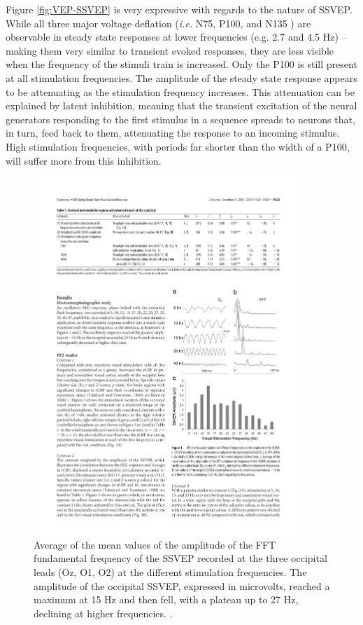 Figure \ref{fig:VEP-SSVEP} is very expressive with regards to the nature of SSVEP. 
While all three major voltage deflation (\textit{i.e.} N75, P100, and N135 ) are observable in steady state responses at lower frequencies (e.g. 2.7 and 4.5 Hz) -- making them very similar to transient evoked responses, they are less visible when the frequency of the stimuli train is increased. 
Only the P100 is still present at all stimulation frequencies. The amplitude of the steady state response appears to be attenuating as the stimulation frequency increases. 
This attenuation can be explained by latent inhibition, meaning that the transient excitation of the neural generators responding to the first stimulus in a sequence spreads to neurons that, in turn, feed back to them, attenuating the response to an incoming stimulus.
High stimulation frequencies, with periods far shorter than the width of a P100, will suffer more from this inhibition.

\begin{figure}[!ht]
    \centering
    \includegraphics[width=4.0in]{Figures/SSVEP-frequencies.pdf}
    \caption{\footnotesize{Average of the
    mean values of the amplitude of the FFT fundamental frequency of the SSVEP
    recorded at the three occipital leads (Oz, O1, O2) at
    the different stimulation frequencies. The amplitude of the occipital SSVEP,
    expressed in microvolts, reached a maximum at 15 Hz and then fell, with a
    plateau up to 27 Hz, declining at higher frequencies. \citep[Reproduced from][]{pastor_human_2003}.}}
    \label{fig:SSVEP-frequencies}
\end{figure}
\par

